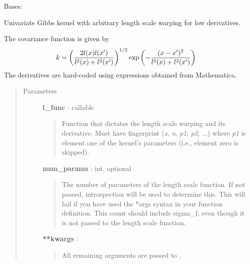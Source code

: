 \documentclass[letterpaper,10pt,english]{sphinxmanual}
\begin{document}

\begin{fulllineitems}
\label{gptools.kernel:gptools.kernel.gibbs.GibbsKernel1d}
Bases: {\hyperref[gptools.kernel:gptools.kernel.core.Kernel]{}}

Univariate Gibbs kernel with arbitrary length scale warping for low derivatives.

The covariance function is given by
\begin{gather}
\begin{split}k = \left ( \frac{2l(x)l(x')}{l^2(x)+l^2(x')} \right )^{1/2}\exp\left ( -\frac{(x-x')^2}{l^2(x)+l^2(x')} \right )\end{split}\notag
\end{gather}
The derivatives are hard-coded using expressions obtained from Mathematica.
\begin{quote}\begin{description}
\item[{Parameters}] \leavevmode
\textbf{l\_func} : callable
\begin{quote}

Function that dictates the length scale warping and its derivative.
Must have fingerprint (\emph{x}, \emph{n}, \emph{p1}, \emph{p2}, ...) where \emph{p1} is element
one of the kernel's parameters (i.e., element zero is skipped).
\end{quote}

\textbf{num\_params} : int, optional
\begin{quote}

The number of parameters of the length scale function. If not passed,
introspection will be used to determine this. This will fail if you have
used the *args syntax in your function definition. This count should
include sigma\_f, even though it is not passed to the length scale
function.
\end{quote}

\textbf{**kwargs} :
\begin{quote}

All remaining arguments are passed to {\hyperref[gptools.kernel:gptools.kernel.core.Kernel]{}}.
\end{quote}

\end{description}\end{quote}


\end{fulllineitems}
\end{document}

